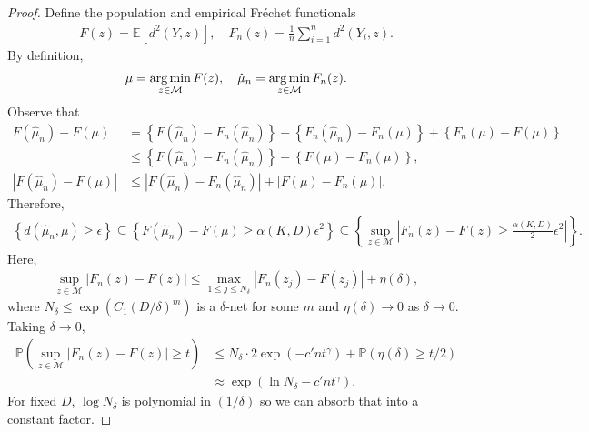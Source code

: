 \begin{proof}
    Define the population and empirical Fréchet functionals
    \begin{align*}
        F(z) = \mathbb{E}[d^2(Y, z)], \quad F_n(z) = \frac{1}{n}\sum^n_{i=1}d^2(Y_i, z).
    \end{align*}
    By definition,
    \begin{align*}
        \mu = \operatorname*{arg\,min}_{z \in \mathcal{M}} F(z), \quad \hat{\mu}_n = \operatorname*{arg\,min}_{z \in \mathcal{M}} F_n(z).
    \end{align*}
    Observe that
    \begin{align*}
        F(\hat{\mu}_n) - F(\mu) &= \left\{F(\hat{\mu}_n) - F_n(\hat{\mu}_n)\right\} + \left\{F_n(\hat{\mu}_n) - F_n(\mu)\right\} + \left\{F_n(\mu) - F(\mu)\right\} \\
        &\leq \left\{F(\hat{\mu}_n) - F_n(\hat{\mu}_n)\right\} - \left\{F(\mu) - F_n(\mu)\right\}, \\
        \left|F(\hat{\mu}_n) - F(\mu)\right| &\leq \left|F(\hat{\mu}_n) - F_n(\hat{\mu}_n)\right| + \left|F(\mu) - F_n(\mu)\right|.
    \end{align*}
    Therefore,
    \begin{align*}
        \left\{d(\hat{\mu}_n, \mu) \geq \epsilon \right\} \subseteq \left\{F(\hat{\mu}_n) - F(\mu) \geq \alpha(K, D)\epsilon^2 \right\} \subseteq \left\{\sup_{z \in \mathcal{M}}\left|F_n(z) - F(z) \geq \frac{\alpha(K, D)}{2}\epsilon^2 \right|\right\}.
    \end{align*}
    Here,
    \begin{align*}
        \sup_{z \in \mathcal{M}}\left|F_n(z) - F(z)\right| \leq \max_{1\leq j \leq N_\delta}\left|F_n(z_j) - F(z_j)\right| + \eta(\delta),
    \end{align*}
    where $N_\delta \leq \exp(C_1(D / \delta)^m)$ is a $\delta$-net for some $m$ and $\eta(\delta) \to 0$ as $\delta \to 0$.
    Taking $\delta \to 0$,
    \begin{align*}
        \mathbb{P}\left(\sup_{z \in \mathcal{M}}\left|F_n(z) - F(z)\right| \geq t \right) &\leq N_\delta \cdot 2\exp\left(-c' n t^\gamma \right) + \mathbb{P}(\eta(\delta) \geq t / 2) \\
        &\approx \exp(\ln N_\delta - c' n t^\gamma).
    \end{align*}
    For fixed $D$, $\log N_\delta$ is polynomial in $(1 / \delta)$ so we can absorb that into a constant factor.
\end{proof}

\clearpage

